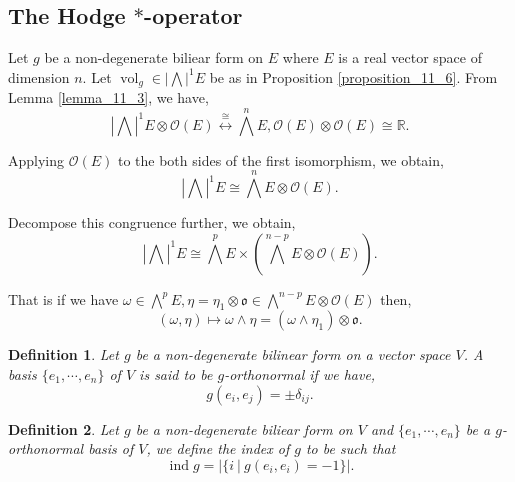 \documentclass[8pt]{article}
\newtheorem{definition}{Definition}[section]
\DeclareMathOperator{\ind}{ind}
\DeclareMathOperator{\vol}{vol}
\newcommand{\R}[0]{\mathbb{R}}
\newcommand{\sep}[0]{\:|\:}
\begin{document}
\subsection{The Hodge $\ast$-operator}

Let $g$ be a non-degenerate biliear form on $E$ where $E$ is a real vector space of dimension $n$. Let $\vol_g\in\left|\bigwedge\right|^1E$ be as in Proposition \ref{proposition_11_6}. From Lemma \ref{lemma_11_3}, we have,
\begin{equation*}
    \left\vert\bigwedge\right\vert^1 E\otimes\mathcal{O}(E)\stackrel{\cong}{\longleftrightarrow} \bigwedge^nE, \mathcal{O}(E)\otimes\mathcal{O}(E)\cong\R.
  \end{equation*}

  Applying $\mathcal{O}(E)$ to the both sides of the first isomorphism, we obtain,
  \begin{equation*}
    \left\vert\bigwedge\right\vert^1 E\cong \bigwedge^nE\otimes\mathcal{O}(E).
  \end{equation*}

  Decompose this congruence further, we obtain,
  \begin{equation*}
    \left\vert\bigwedge\right\vert^1 E\cong \bigwedge^pE\times\left(\bigwedge^{n-p}E\otimes\mathcal{O}(E)\right).
  \end{equation*}

  That is if we have $\omega\in\bigwedge^pE,\eta = \eta_1\otimes \mathfrak{o}\in\bigwedge^{n-p}E\otimes\mathcal{O}(E)$ then,
  \begin{equation*}
    (\omega,\eta) \mapsto \omega\wedge\eta = (\omega\wedge\eta_1)\otimes\mathfrak{o}.
  \end{equation*}

\begin{definition}
  Let $g$ be a non-degenerate bilinear form on a vector space $V$. A basis $\{e_1,\cdots,e_n\}$ of $V$ is said to be $g$-orthonormal if we have,
  \begin{equation*}
    g(e_i,e_j) = \pm\delta_{ij}.
  \end{equation*}
\end{definition}

\begin{definition}
  Let $g$ be a non-degenerate biliear form on $V$ and $\{e_1,\cdots,e_n\}$ be a $g$-orthonormal basis of $V$, we define the index of $g$ to be such that 
  \begin{equation*}
    \ind g = \vert\{i\sep g(e_i,e_i) = -1\}\vert.
  \end{equation*}
\end{definition}
\end{document}

